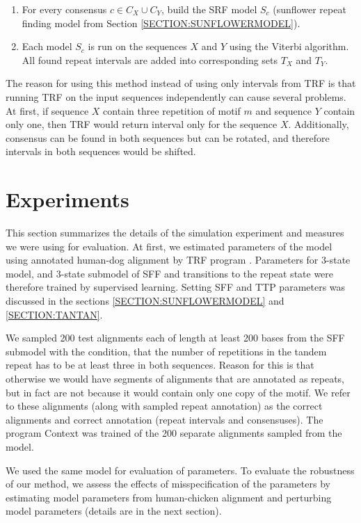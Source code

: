 \begin{itemize}[itemsep=-1mm]
\begin{enumerate}[itemsep=-1mm]
\item For every consensus $c\in C_X\cup C_Y$, build the SRF model $S_c$
(sunflower repeat finding model from Section \ref{SECTION:SUNFLOWERMODEL}). 

\item Each model $S_c$ is run on the sequences $X$ and $Y$ using the Viterbi
algorithm. All found repeat intervals are added into corresponding sets $T_X$
and $T_Y$.

\end{enumerate}
The reason for using this method instead of using only intervals from TRF is
that running TRF on the input sequences independently can cause several
problems. At first, if sequence $X$ contain three repetition of motif $m$ and
sequence $Y$ contain only one, then TRF would return interval only for the
sequence $X$. Additionally, consensus can be found in both sequences but can be
rotated, and therefore intervals in both sequences would be shifted.

\end{itemize}

\section{Experiments}

This section summarizes the details of the simulation experiment and measures
we were using for evaluation. At first, we estimated parameters of the model
using annotated human-dog alignment by TRF program \cite{Benson1999}.
Parameters for 3-state model, and 3-state submodel of SFF and transitions to
the repeat state were therefore trained by supervised learning. Setting SFF and
TTP parameters was discussed in the sections \ref{SECTION:SUNFLOWERMODEL} and
\ref{SECTION:TANTAN}.

We sampled 200 test alignments each of length at least 200 bases from the SFF
submodel with the condition, that the number of repetitions in the tandem
repeat has to be at least three in both sequences. Reason for this is that
otherwise we would have segments of alignments that are annotated as repeats,
but in fact are not because it would contain only one copy of the motif. We
refer to these alignments (along with sampled repeat annotation) as the correct
alignments and correct annotation (repeat intervals and consensuses).  The
program Context \cite{Hickey2011} was trained of the 200 separate alignments
sampled from the model. 


We used the same model for evaluation of parameters. To evaluate the robustness
of our method, we assess the effects of misspecification of the parameters by
estimating model parameters from human-chicken alignment and perturbing model
parameters (details are in the next section).

